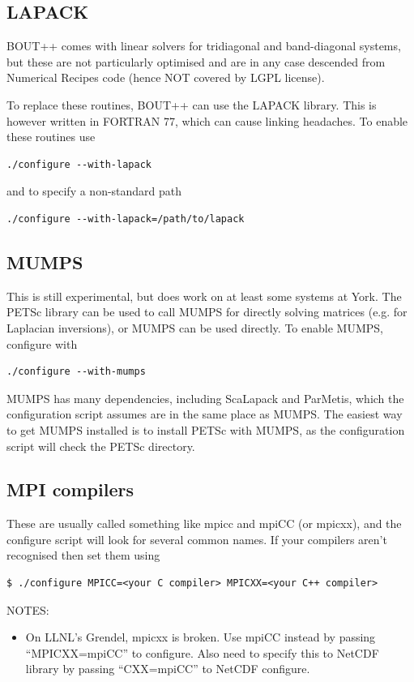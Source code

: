 \documentclass[12pt]{article}
\begin{document}
\subsection{LAPACK}
%
BOUT++ comes with linear solvers for tridiagonal and band-diagonal systems, but
these are not particularly optimised and are in any case descended from
Numerical Recipes code (hence NOT covered by LGPL license).

To replace these routines, BOUT++ can use the LAPACK library. This is however
written in FORTRAN 77, which can cause linking headaches.  To enable these
routines use
%
\begin{verbatim}
./configure --with-lapack
\end{verbatim}
%
and to specify a non-standard path
%
\begin{verbatim}
./configure --with-lapack=/path/to/lapack
\end{verbatim}
%



\subsection{MUMPS}
\label{sec:MUMPS}
%
This is still experimental, but does work on at least some systems at York.
The PETSc library can be used to call MUMPS for directly solving matrices (e.g.
for Laplacian inversions), or MUMPS can be used directly.  To enable MUMPS,
configure with
%
\begin{verbatim}
./configure --with-mumps
\end{verbatim}
%
MUMPS has many dependencies, including ScaLapack and ParMetis, which the
configuration script assumes are in the same place as MUMPS. The easiest way to
get MUMPS installed is to install PETSc with MUMPS, as the configuration script
will check the PETSc directory.



\subsection{MPI compilers}
%
These are usually called something like mpicc and mpiCC (or mpicxx), and the
configure script will look for several common names.  If your compilers aren't
recognised then set them using
%
\begin{verbatim}
$ ./configure MPICC=<your C compiler> MPICXX=<your C++ compiler>
\end{verbatim}
%
NOTES:
%
\begin{itemize}
\item On LLNL's Grendel, mpicxx is broken. Use mpiCC instead by passing
    ``MPICXX=mpiCC'' to configure. Also need to specify this to NetCDF library
    by passing ``CXX=mpiCC'' to NetCDF configure.
\end{itemize}
%
\end{document}
